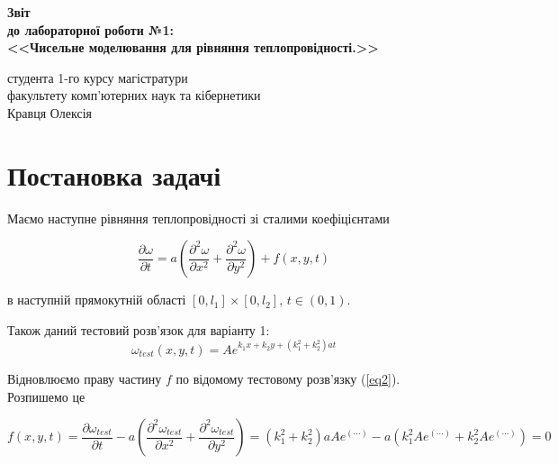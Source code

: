 \documentclass[a4paper,12pt]{article}
\begin{document}
	
	\begin{titlepage}
		\vspace*{6cm}
		\begin{center}
			
			\large
			\textbf{Звіт}\\
			\textbf{до лабораторної роботи №1:}\\
			\textbf{<<Чисельне моделювання для рівняння теплопровідності.>>}
			
		\end{center}
		
		\vspace{8cm}
		\begin{flushright}
			студента 1-го курсу магістратури\\
			факультету комп'ютерних наук та кібернетики\\
			Кравця Олексія
		\end{flushright}
		
	\end{titlepage}

\newpage
\tableofcontents
\newpage
\section{Постановка задачі}

Маємо наступне рівняння теплопровідності зі сталими коефіцієнтами

\begin{equation} \label{eq1}
	\frac{\partial \omega}{\partial t} = a \left( \frac{\partial^2 \omega}{\partial x^2} + \frac{\partial^2 \omega}{\partial y^2}\right) + f(x,y,t) 
\end{equation}

в наступній прямокутній області $[0,l_1]\times[0,l_2]$, $t \in (0,1)$.

Також даний тестовий розв'язок для варіанту 1:
\begin{equation} \label{eq2}
	\omega_{test}(x,y,t) = A e^{k_1 x + k_2 y + (k_1^2 + k_2^2) a t}
\end{equation}

Відновлюємо праву частину $f$ по відомому тестовому розв'язку (\ref{eq2}). Розпишемо це

\begin{displaymath}
	f(x,y,t) = \frac{\partial \omega_{test}}{\partial t} - a\left( \frac{\partial^2 \omega_{test}}{\partial x^2} + \frac{\partial^2 \omega_{test}}{\partial y^2}\right) = (k_1^2 + k_2^2)a A e^{(\cdots)} - a \left( k_1^2 A e^{(\cdots)} + k_2^2 A e^{(\cdots)} \right) =0
\end{displaymath}
\end{document}
